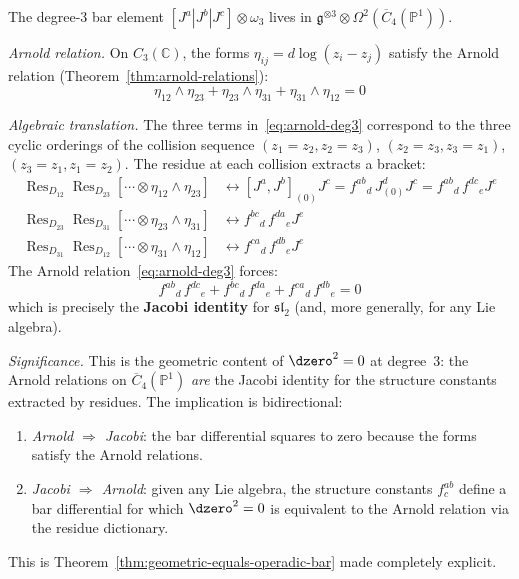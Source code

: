 \begin{computation}
\label{comp:geom-alg-comparison-deg3}

The degree-3 bar element
$[J^a|J^b|J^c] \otimes \omega_3$
lives in $\mathfrak{g}^{\otimes 3} \otimes
\Omega^2(\overline{C}_4(\mathbb{P}^1))$.

\emph{Arnold relation.}
On $C_3(\mathbb{C})$, the forms $\eta_{ij} = d\log(z_i - z_j)$
satisfy the Arnold relation
(Theorem~\ref{thm:arnold-relations}):
\begin{equation}\label{eq:arnold-deg3}
\eta_{12} \wedge \eta_{23} + \eta_{23} \wedge \eta_{31}
+ \eta_{31} \wedge \eta_{12} = 0
\end{equation}

\emph{Algebraic translation.}
The three terms in~\eqref{eq:arnold-deg3} correspond to the three
cyclic orderings of the collision sequence
$(z_1 = z_2, z_2 = z_3)$, $(z_2 = z_3, z_3 = z_1)$,
$(z_3 = z_1, z_1 = z_2)$.
The residue at each collision extracts a bracket:
\begin{align}
\operatorname{Res}_{D_{12}}\operatorname{Res}_{D_{23}}
[\cdots \otimes \eta_{12} \wedge \eta_{23}]
&\leftrightarrow [J^a, J^b]_{(0)} J^c
= {f^{ab}}_d\, J^d_{(0)} J^c
= {f^{ab}}_d\, {f^{dc}}_e J^e \\
\operatorname{Res}_{D_{23}}\operatorname{Res}_{D_{31}}
[\cdots \otimes \eta_{23} \wedge \eta_{31}]
&\leftrightarrow {f^{bc}}_d\, {f^{da}}_e J^e \\
\operatorname{Res}_{D_{31}}\operatorname{Res}_{D_{12}}
[\cdots \otimes \eta_{31} \wedge \eta_{12}]
&\leftrightarrow {f^{ca}}_d\, {f^{db}}_e J^e
\end{align}
The Arnold relation~\eqref{eq:arnold-deg3} forces:
\begin{equation}\label{eq:jacobi-from-arnold}
{f^{ab}}_d\, {f^{dc}}_e + {f^{bc}}_d\, {f^{da}}_e
+ {f^{ca}}_d\, {f^{db}}_e = 0
\end{equation}
which is precisely the \textbf{Jacobi identity} for
$\mathfrak{sl}_2$ (and, more generally, for any Lie algebra).

\emph{Significance.}
This is the geometric content of $\dzero^2 = 0$ at degree~3:
the Arnold relations on
$\overline{C}_4(\mathbb{P}^1)$ \emph{are} the Jacobi identity
for the structure constants extracted by residues. The
implication is bidirectional:
\begin{enumerate}
\item \emph{Arnold $\Rightarrow$ Jacobi}: the bar differential
 squares to zero because the forms satisfy the Arnold relations.
\item \emph{Jacobi $\Rightarrow$ Arnold}: given any Lie algebra,
 the structure constants $f^{ab}_c$ define a bar differential
 for which $\dzero^2 = 0$ is equivalent to the Arnold relation via
 the residue dictionary.
\end{enumerate}
This is Theorem~\ref{thm:geometric-equals-operadic-bar} made
completely explicit.
\end{computation}

